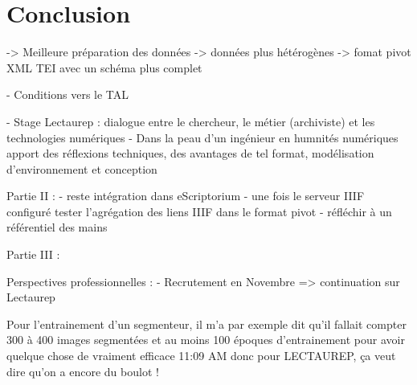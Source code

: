 \part*{Conclusion}

-> Meilleure préparation des données 
-> données plus hétérogènes
-> fomat pivot XML TEI avec un schéma plus complet

- Conditions vers le TAL


- Stage Lectaurep : dialogue entre le chercheur, le métier (archiviste) et les technologies numériques 
- Dans la peau d'un ingénieur en humnités numériques apport des réflexions techniques, des avantages de tel format, modélisation d'environnement et conception 

Partie II : 
- reste intégration dans eScriptorium 
- une fois le serveur IIIF configuré tester l'agrégation des liens IIIF dans le format pivot
- réfléchir à un référentiel des mains

Partie III : 


Perspectives professionnelles : 
- Recrutement en Novembre => continuation sur Lectaurep 


Pour l'entrainement d'un segmenteur, il m'a par exemple dit qu'il fallait compter 300 à 400 images segmentées et au moins 100 époques d'entrainement pour avoir quelque chose de vraiment efficace
11:09 AM
donc pour LECTAUREP, ça veut dire qu'on a encore du boulot !